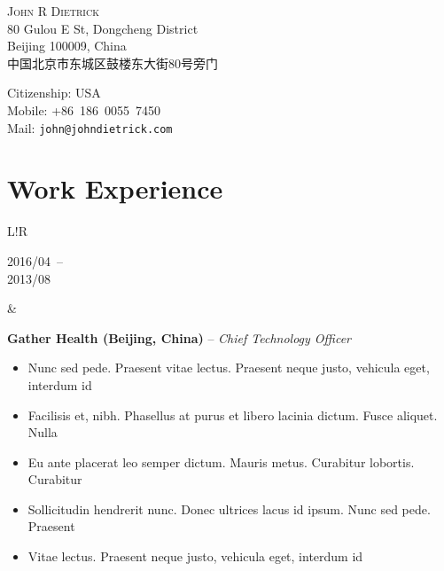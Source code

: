 \documentclass[10pt]{article}
\newcommand\VRule{\color{lightgray}\vrule width 0.5pt}
\begin{document}
\begin{CJK}{UTF8}{gbsn}

\vspace{0pt}
\begin{center}
    \flushleft
    \begin{minipage}[b]{0.45\linewidth}
        \vspace{0pt}
        {\huge\textsc{John R Dietrick}}\\
        80 Gulou E St, Dongcheng District\\
        Beijing 100009, China\\
        中国北京市东城区鼓楼东大街80号旁门
    \end{minipage}
    \begin{minipage}[b]{0.45\linewidth}
        \vspace{0pt}
        Citizenship: USA\\
        Mobile: +86~186~0055~7450\\
        Mail: \texttt{john@johndietrick.com}
    \end{minipage}
\end{center}

\vspace{-6pt}

\section*{Work Experience}
\begin{tabular}{L!{\VRule}R}
    \parbox[t]{1.0\linewidth}{
        {\scriptsize 2016/04}~--\\
        {\scriptsize 2013/08}
    }&
    \parbox[t]{1.0\linewidth}{
        {\bf Gather Health (Beijing, China)} -- \textit{Chief Technology Officer}\\
        \vspace{-8pt}
        \begin{itemize}[leftmargin=16pt]
            \item Nunc sed pede. Praesent vitae lectus. Praesent neque justo, vehicula eget, interdum id
            \item Facilisis et, nibh. Phasellus at purus et libero lacinia dictum. Fusce aliquet. Nulla
            \item Eu ante placerat leo semper dictum. Mauris metus. Curabitur lobortis. Curabitur
            \item Sollicitudin hendrerit nunc. Donec ultrices lacus id ipsum. Nunc sed pede. Praesent
            \item Vitae lectus. Praesent neque justo, vehicula eget, interdum id
        \end{itemize}
    }\\


\end{tabular}
\end{CJK}
\end{document}
